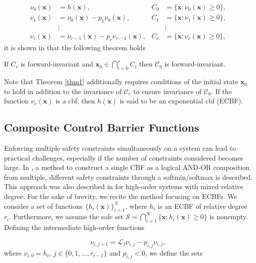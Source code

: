 \small
\begin{align*}
    \nu_0(\mathbf{x}) &= h(\mathbf{x}), & C_0 &= \{ \mathbf{x} : \nu_0(\mathbf{x}) \geq 0 \}, \\
    \nu_1(\mathbf{x}) &= \dot{\nu}_0(\mathbf{x}) - p_1 \nu_0(\mathbf{x}), & C_1 &= \{ \mathbf{x} : \nu_1(\mathbf{x}) \geq 0 \}, \\
    &\vdots & &\vdots \\
    \nu_r(\mathbf{x}) &= \dot{\nu}_{r-1}(\mathbf{x}) - p_r \nu_{r-1}(\mathbf{x}), & C_r &= \{ \mathbf{x} : \nu_r(\mathbf{x}) \geq 0 \},
\end{align*}
\normalsize
it is shown in \cite{ECBF} that the following theorem holds

\begin{theorem}\cite{ames2019control}\label{thm1}
If $C_r$ is forward-invariant and $\mathbf{x}_0 \in \bigcap_{i=0}^r C_i$ then $\mathcal{C}_0$ is forward-invariant.
\end{theorem}
Note that Theorem \ref{thm1} additionally requires conditions of the initial state $\mathbf{x}_0$ to hold in addition to the invariance of $\mathcal{C}_r$ to ensure invariance of $\mathcal{C}_0$. If the function $\nu_r(\mathbf{x})$ is a \ac{cbf}, then $h(\mathbf{x})$ is said to be an exponential \ac{cbf} (ECBF).

\subsection{Composite Control Barrier Functions}
Enforcing multiple safety constraints simultaneously on a system can lead to practical challenges, especially if the number of constraints considered becomes large. In \cite{compositeCBFames}, a method to construct a single CBF as a logical AND-OR composition from multiple, different safety constraints through a softmin/softmax is described. This approach was also described in \cite{compositeCBFhoagg} for high-order systems with mixed relative degree. For the sake of brevity, we recite the method focusing on ECBFs. We consider a set of functions $\{h_i(\mathbf{x})\}_{i=1}^N$, where $h_i$ is an ECBF of relative degree $r_i$. Furthermore, we assume the safe set $\mathcal{S} = \bigcap_{i=1}^{N} \{\mathbf{x} : h_i(\mathbf{x}) \geq 0\}$ is nonempty. Defining the intermediate high-order functions

\small
\begin{equation}\label{ccbf1}
    \nu_{i,j+1} = \mathcal{L}_f \nu_{i,j} - p_{i,j} \nu_{i,j} ,
\end{equation}
\normalsize
where $\nu_{i,0} = h_i$, $j \in \{0,1, \hdots, r_{i-1} \}$ and $p_{i,j}<0$, we define the sets

